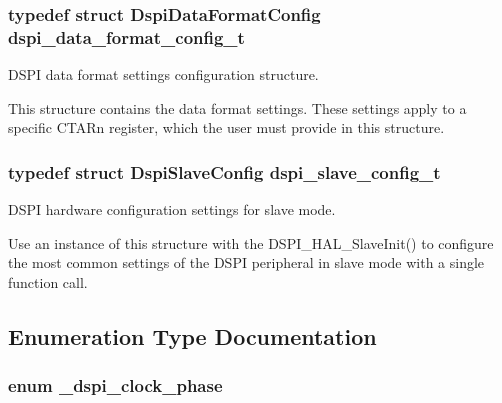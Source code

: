 \subsubsection[{\texorpdfstring{dspi\+\_\+data\+\_\+format\+\_\+config\+\_\+t}{dspi_data_format_config_t}}]{\setlength{\rightskip}{0pt plus 5cm}typedef struct {\bf Dspi\+Data\+Format\+Config}  {\bf dspi\+\_\+data\+\_\+format\+\_\+config\+\_\+t}}\hypertarget{group__dspi__hal_ga0eeb6e5b9b331a951edcf24c269bdfcd}{}\label{group__dspi__hal_ga0eeb6e5b9b331a951edcf24c269bdfcd}


D\+S\+PI data format settings configuration structure. 

This structure contains the data format settings. These settings apply to a specific C\+T\+A\+Rn register, which the user must provide in this structure. 
\subsubsection[{\texorpdfstring{dspi\+\_\+slave\+\_\+config\+\_\+t}{dspi_slave_config_t}}]{\setlength{\rightskip}{0pt plus 5cm}typedef struct {\bf Dspi\+Slave\+Config}  {\bf dspi\+\_\+slave\+\_\+config\+\_\+t}}\hypertarget{group__dspi__hal_gad42506023f30bef1b75fbda14adc91c3}{}\label{group__dspi__hal_gad42506023f30bef1b75fbda14adc91c3}


D\+S\+PI hardware configuration settings for slave mode. 

Use an instance of this structure with the D\+S\+P\+I\+\_\+\+H\+A\+L\+\_\+\+Slave\+Init() to configure the most common settings of the D\+S\+PI peripheral in slave mode with a single function call. 

\subsection{Enumeration Type Documentation}
\subsubsection[{\texorpdfstring{\+\_\+dspi\+\_\+clock\+\_\+phase}{_dspi_clock_phase}}]{\setlength{\rightskip}{0pt plus 5cm}enum {\bf \+\_\+dspi\+\_\+clock\+\_\+phase}}\hypertarget{group__dspi__hal_ga648d70d13ec12505a80c423841f53510}{}\label{group__dspi__hal_ga648d70d13ec12505a80c423841f53510}



